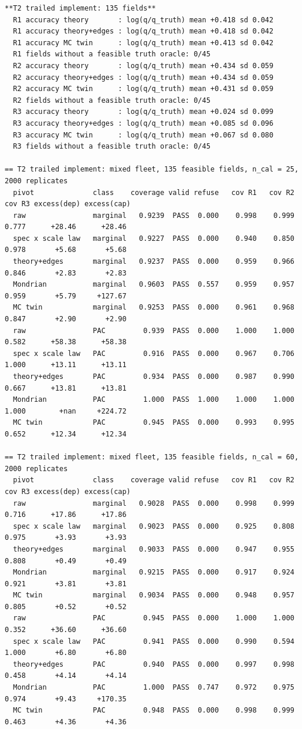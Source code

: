 \documentclass[preprint,12pt,authoryear]{elsarticle}
\begin{document}
\begin{Verbatim}[fontsize=\tiny,breaklines]
**T2 trailed implement: 135 fields**
  R1 accuracy theory       : log(q/q_truth) mean +0.418 sd 0.042
  R1 accuracy theory+edges : log(q/q_truth) mean +0.418 sd 0.042
  R1 accuracy MC twin      : log(q/q_truth) mean +0.413 sd 0.042
  R1 fields without a feasible truth oracle: 0/45
  R2 accuracy theory       : log(q/q_truth) mean +0.434 sd 0.059
  R2 accuracy theory+edges : log(q/q_truth) mean +0.434 sd 0.059
  R2 accuracy MC twin      : log(q/q_truth) mean +0.431 sd 0.059
  R2 fields without a feasible truth oracle: 0/45
  R3 accuracy theory       : log(q/q_truth) mean +0.024 sd 0.099
  R3 accuracy theory+edges : log(q/q_truth) mean +0.085 sd 0.096
  R3 accuracy MC twin      : log(q/q_truth) mean +0.067 sd 0.080
  R3 fields without a feasible truth oracle: 0/45

== T2 trailed implement: mixed fleet, 135 feasible fields, n_cal = 25, 2000 replicates
  pivot              class    coverage valid refuse   cov R1   cov R2   cov R3 excess(dep) excess(cap)
  raw                marginal   0.9239  PASS  0.000    0.998    0.999    0.777      +28.46      +28.46
  spec x scale law   marginal   0.9227  PASS  0.000    0.940    0.850    0.978       +5.68       +5.68
  theory+edges       marginal   0.9237  PASS  0.000    0.959    0.966    0.846       +2.83       +2.83
  Mondrian           marginal   0.9603  PASS  0.557    0.959    0.957    0.959       +5.79     +127.67
  MC twin            marginal   0.9253  PASS  0.000    0.961    0.968    0.847       +2.90       +2.90
  raw                PAC         0.939  PASS  0.000    1.000    1.000    0.582      +58.38      +58.38
  spec x scale law   PAC         0.916  PASS  0.000    0.967    0.706    1.000      +13.11      +13.11
  theory+edges       PAC         0.934  PASS  0.000    0.987    0.990    0.667      +13.81      +13.81
  Mondrian           PAC         1.000  PASS  1.000    1.000    1.000    1.000        +nan     +224.72
  MC twin            PAC         0.945  PASS  0.000    0.993    0.995    0.652      +12.34      +12.34

== T2 trailed implement: mixed fleet, 135 feasible fields, n_cal = 60, 2000 replicates
  pivot              class    coverage valid refuse   cov R1   cov R2   cov R3 excess(dep) excess(cap)
  raw                marginal   0.9028  PASS  0.000    0.998    0.999    0.716      +17.86      +17.86
  spec x scale law   marginal   0.9023  PASS  0.000    0.925    0.808    0.975       +3.93       +3.93
  theory+edges       marginal   0.9033  PASS  0.000    0.947    0.955    0.808       +0.49       +0.49
  Mondrian           marginal   0.9215  PASS  0.000    0.917    0.924    0.921       +3.81       +3.81
  MC twin            marginal   0.9034  PASS  0.000    0.948    0.957    0.805       +0.52       +0.52
  raw                PAC         0.945  PASS  0.000    1.000    1.000    0.352      +36.60      +36.60
  spec x scale law   PAC         0.941  PASS  0.000    0.990    0.594    1.000       +6.80       +6.80
  theory+edges       PAC         0.940  PASS  0.000    0.997    0.998    0.458       +4.14       +4.14
  Mondrian           PAC         1.000  PASS  0.747    0.972    0.975    0.974       +9.43     +170.35
  MC twin            PAC         0.948  PASS  0.000    0.998    0.999    0.463       +4.36       +4.36


\end{Verbatim}
\end{document}
